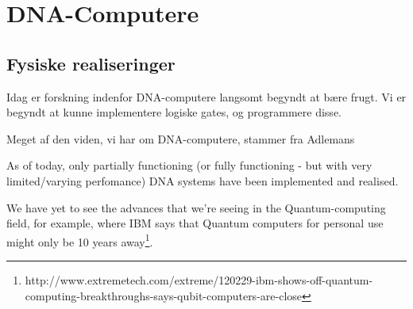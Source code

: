 
\section{DNA-Computere}

\subsection{Fysiske realiseringer}
Idag er forskning indenfor DNA-computere langsomt begyndt at bære frugt. Vi
er begyndt at kunne implementere logiske gates, og programmere disse.

Meget af den viden, vi har om DNA-computere, stammer fra Adlemans 


As of today, only partially functioning (or fully functioning - but with very
limited/varying perfomance) DNA systems have been implemented and realised.

We have yet to see the advances that we're seeing in the Quantum-computing
field, for example, where IBM says that Quantum computers for personal use might
only be 10 years away\footnote{http://www.extremetech.com/extreme/120229-ibm-shows-off-quantum-computing-breakthroughs-says-qubit-computers-are-close}.


